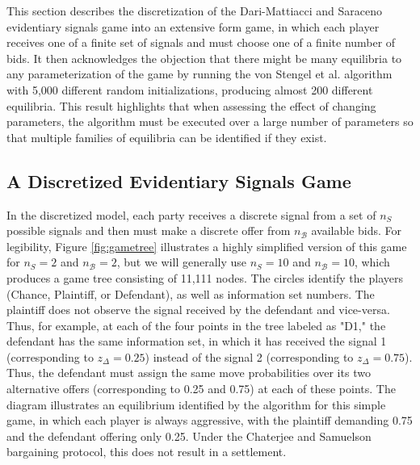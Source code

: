 \documentclass{article}
\begin{document}
This section describes the discretization of the Dari-Mattiacci and Saraceno evidentiary signals game into an extensive form game, in which each player receives one of a finite set of signals and must choose one of a finite number of bids. It then acknowledges the objection that there might be many equilibria to any parameterization of the game by running the von Stengel et al. algorithm with 5,000 different random initializations, producing almost 200 different equilibria. This result highlights that when assessing the effect of changing parameters, the algorithm must be executed over a large number of parameters so that multiple families of equilibria can be identified if they exist.

\subsection{A Discretized Evidentiary Signals Game} 

In the discretized model, each party receives a discrete signal from a set of $n_S$ possible signals and then must make a discrete offer from $n_{\mathcal{B}}$ available bids. For legibility, Figure \ref{fig:gametree} illustrates a highly simplified version of this game for  $n_S=2$ and $n_{\mathcal{B}}=2$, but we will generally use  $n_S=10$ and $n_{\mathcal{B}}=10$, which produces a game tree consisting of 11,111 nodes. The circles identify the players (Chance, Plaintiff, or Defendant), as well as information set numbers. The plaintiff does not observe the signal received by the defendant and vice-versa. Thus, for example, at each of the four points in the tree labeled as "D1," the defendant has the same information set, in which it has received the signal 1 (corresponding to $z_\Delta = 0.25$) instead of the signal 2 (corresponding to $z_\Delta = 0.75$). Thus, the defendant must assign the same move probabilities over its two alternative offers (corresponding to 0.25 and 0.75) at each of these points. The diagram illustrates an equilibrium identified by the algorithm for this simple game, in which each player is always aggressive, with the plaintiff demanding 0.75 and the defendant offering only 0.25. Under the Chaterjee and Samuelson bargaining protocol, this does not result in a settlement.
\end{document}
